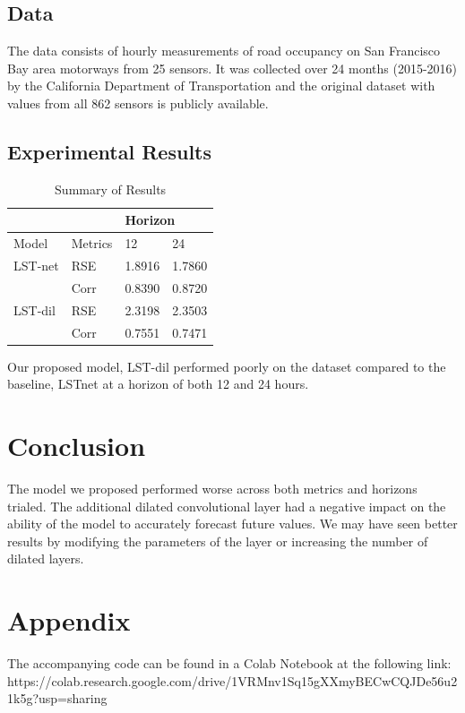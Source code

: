 \documentclass{article}
\begin{document}
\subsection{Data}
The data consists of hourly measurements of road occupancy on San Francisco Bay area motorways from 25 sensors. It was collected over 24 months (2015-2016) by the California Department of Transportation and the original dataset with values from all 862 sensors is publicly available.

\subsection{Experimental Results}


\begin{table}[!h]
	\renewcommand{\arraystretch}{1.3}
	
	\label{netstructtab}
	\centering
	\begin{tabular}{ll|ll}
		\hline
		&         & \multicolumn{2}{l}{Horizon} \\ \hline
		Model   & Metrics & 12           & 24           \\ \hline
		LST-net & RSE     &    1.8916         &     1.7860         \\ 
		& Corr    &      0.8390       &        0.8720     \\ \hline
		LST-dil & RSE     &     2.3198          &    2.3503          \\ 
		& Corr    &      0.7551         &        0.7471      \\ \hline
	\end{tabular}
\caption{Summary of Results}
\end{table}

Our proposed model, LST-dil performed poorly on the dataset compared to the baseline, LSTnet at a horizon of both 12 and 24 hours. 

\section{Conclusion}
The model we proposed performed worse across both metrics and horizons trialed. The additional dilated convolutional layer had a negative impact on the ability of the model to accurately forecast future values. We may have seen better results by modifying the parameters of the layer or increasing the number of dilated layers.



\vfill\pagebreak





\vfill\pagebreak

\section{Appendix}
The accompanying code can be found in a Colab Notebook at the following link:
https://colab.research.google.com/drive/1VRMnv1Sq15gXXmyBECwCQJDe56u21k5g?usp=sharing
\end{document}

